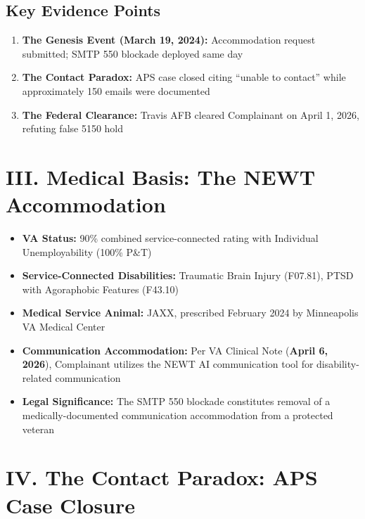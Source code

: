 \documentclass[11pt, a4paper]{article}
\begin{document}
\subsection{Key Evidence Points}

\begin{enumerate}
    \item \textbf{The Genesis Event (March 19, 2024):} Accommodation request submitted; SMTP 550 blockade deployed same day
    \item \textbf{The Contact Paradox:} APS case closed citing ``unable to contact'' while approximately 150 emails were documented
    \item \textbf{The Federal Clearance:} Travis AFB cleared Complainant on April 1, 2026, refuting false 5150 hold
\end{enumerate}

\vspace{0.5cm}

\section{III. Medical Basis: The NEWT Accommodation}

\begin{itemize}
    \item \textbf{VA Status:} 90\% combined service-connected rating with Individual Unemployability (100\% P\&T)
    \item \textbf{Service-Connected Disabilities:} Traumatic Brain Injury (F07.81), PTSD with Agoraphobic Features (F43.10)
    \item \textbf{Medical Service Animal:} JAXX, prescribed February 2024 by Minneapolis VA Medical Center
    \item \textbf{Communication Accommodation:} Per VA Clinical Note (\textbf{April 6, 2026}), Complainant utilizes the NEWT AI communication tool for disability-related communication
    \item \textbf{Legal Significance:} The SMTP 550 blockade constitutes removal of a medically-documented communication accommodation from a protected veteran
\end{itemize}

\vspace{0.5cm}

\section{IV. The Contact Paradox: APS Case Closure}
\end{document}
